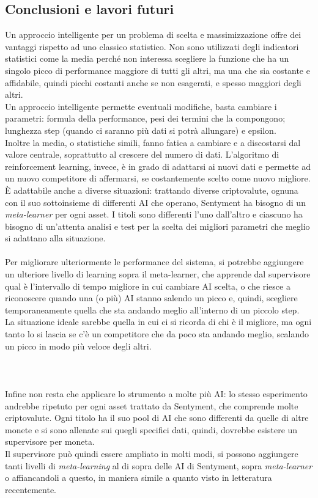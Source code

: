 \documentclass[a4paper,12pt]{report}
\begin{document}
\begin{fig}
\newpage
\chapter{Conclusioni e lavori futuri}
\label{cap5}
Un approccio intelligente per un problema di scelta e massimizzazione offre dei vantaggi rispetto ad uno classico statistico. Non sono utilizzati degli indicatori statistici come la media perché non interessa scegliere la funzione che ha un singolo picco di performance maggiore di tutti gli altri, ma una che sia costante e affidabile, quindi picchi costanti anche se non esagerati, e spesso maggiori degli altri.\\ Un approccio intelligente permette eventuali modifiche, basta cambiare i parametri: formula della performance, pesi dei termini che la compongono; lunghezza step (quando ci saranno più dati si potrà allungare) e epsilon.\\ Inoltre la media, o statistiche simili, fanno fatica a cambiare e a discostarsi dal valore centrale, soprattutto al crescere del numero di dati. L'algoritmo di reinforcement learning, invece, è in grado di adattarsi ai nuovi dati e permette ad un nuovo competitore di affermarsi, se costantemente scelto come nuovo migliore. È adattabile anche a diverse situazioni: trattando diverse criptovalute, ognuna con il suo sottoinsieme di differenti AI che operano, Sentyment ha bisogno di un \textit{meta-learner} per ogni asset. I titoli sono differenti l'uno dall'altro e ciascuno ha bisogno di un'attenta analisi e test per la scelta dei migliori parametri che meglio si adattano alla situazione.
\\~\\Per migliorare ulteriormente le performance del sistema, si potrebbe aggiungere un ulteriore livello di learning sopra il meta-learner, che apprende dal supervisore qual è l'intervallo di tempo migliore in cui cambiare AI scelta, o che riesce a riconoscere quando una (o più) AI stanno salendo un picco e, quindi, scegliere temporaneamente quella che sta andando meglio all'interno di un piccolo step.\\ La situazione ideale sarebbe quella in cui ci si ricorda di chi è il migliore, ma ogni tanto lo si lascia se c'è un competitore che da poco sta andando meglio, scalando un picco in modo più veloce degli altri.
\\~\\\\~\\ Infine non resta che applicare lo strumento a molte più AI: lo stesso esperimento andrebbe ripetuto per ogni asset trattato da Sentyment, che comprende molte criptovalute. Ogni titolo ha il suo pool di AI che sono differenti da quelle di altre monete e si sono allenate sui quegli specifici dati, quindi, dovrebbe esistere un supervisore per moneta.\\ Il supervisore può quindi essere ampliato in molti modi, si possono aggiungere tanti livelli di \textit{meta-learning} al di sopra delle AI di Sentyment, sopra \textit{meta-learner} o affiancandoli a questo, in maniera simile a quanto visto in letteratura recentemente.


\end{fig}
\end{document}
